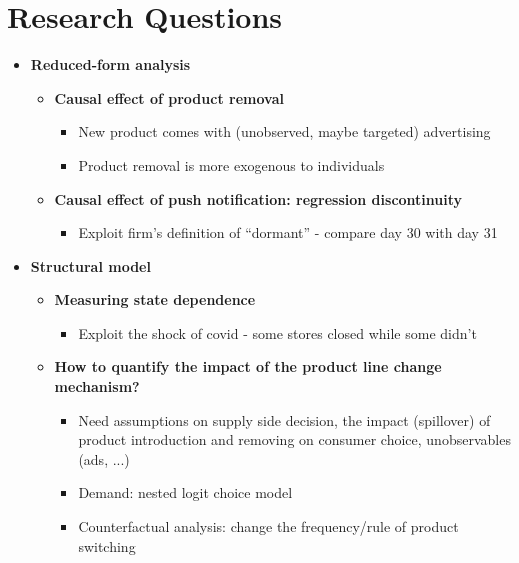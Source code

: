 \documentclass[aspectratio=169]{beamer}  %
\begin{document}
\section{Research Questions}
\begin{frame}{}
\begin{itemize}
    \item \textbf{Reduced-form analysis}
    \begin{itemize}
        \item \textbf{Causal effect of product removal}
        \begin{itemize}
            \item New product comes with (unobserved, maybe targeted) advertising
            \item Product removal is more exogenous to individuals
        \end{itemize}
        \item \textbf{Causal effect of push notification: regression discontinuity}
        \begin{itemize}
            \item Exploit firm's definition of ``dormant'' - compare day 30 with day 31
        \end{itemize}
    \end{itemize}
    \item \textbf{Structural model}
    \begin{itemize}
        \item \textbf{Measuring state dependence}
        \begin{itemize}
            \item Exploit the shock of covid - some stores closed while some didn't
        \end{itemize}
        \item \textbf{How to quantify the impact of the product line change mechanism?}
        \begin{itemize}
            \item Need assumptions on supply side decision, the impact (spillover) of product introduction and removing on consumer choice, unobservables (ads, ...)
            \item Demand: nested logit choice model
            \item Counterfactual analysis: change the frequency/rule of product switching
        \end{itemize}
    \end{itemize}
\end{itemize}    
\end{frame}
\end{document}
